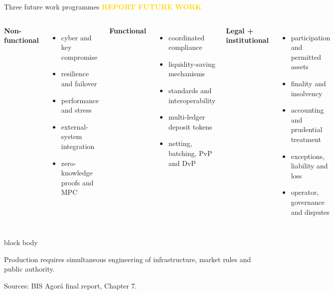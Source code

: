 \documentclass[aspectratio=169,12pt]{beamer}
\newcommand{\rust}[1]{\textcolor{Rust}{\textbf{#1}}}
\newcommand{\blue}[1]{\textcolor{Ocean}{\textbf{#1}}}
\newcommand{\source}[1]{\vfill\par\fontsize{5.4}{6.5}\selectfont\color{Quiet}Sources: #1}
\newcommand{\verytightitems}{\setlength{\itemsep}{0.22em}\setlength{\parskip}{0pt}}
\newcommand{\reporttag}[1]{\textcolor{Gold}{\fontsize{7.2}{8.5}\selectfont\bfseries REPORT #1}}
\newenvironment{statement}{%
  \begin{beamercolorbox}[sep=.18cm,rounded=false,wd=\linewidth]{block body}%
  \fontsize{13}{15.5}\selectfont\bfseries
}{\end{beamercolorbox}}
\begin{document}
\begin{frame}[shrink=30]{Three future work programmes}
  \reporttag{FUTURE WORK}\par\vspace{0.08cm}
  \begin{columns}[T,onlytextwidth]
      \rust{Non-functional}
      \begin{itemize}\verytightitems
        \item cyber and key compromise
        \item resilience and failover
        \item performance and stress
        \item external-system integration
        \item zero-knowledge proofs and MPC
      \end{itemize}
      \blue{Functional}
      \begin{itemize}\verytightitems
        \item coordinated compliance
        \item liquidity-saving mechanisms
        \item standards and interoperability
        \item multi-ledger deposit tokens
        \item netting, batching, PvP and DvP
      \end{itemize}
      \textcolor{Sage}{\textbf{Legal + institutional}}
      \begin{itemize}\verytightitems
        \item participation and permitted assets
        \item finality and insolvency
        \item accounting and prudential treatment
        \item exceptions, liability and loss
        \item operator, governance and disputes
      \end{itemize}
  \end{columns}
  \begin{statement}
    Production requires simultaneous engineering of infrastructure, market rules and public authority.
  \end{statement}
  \source{BIS Agor\'a final report, Chapter 7.}
\end{frame}
\end{document}
